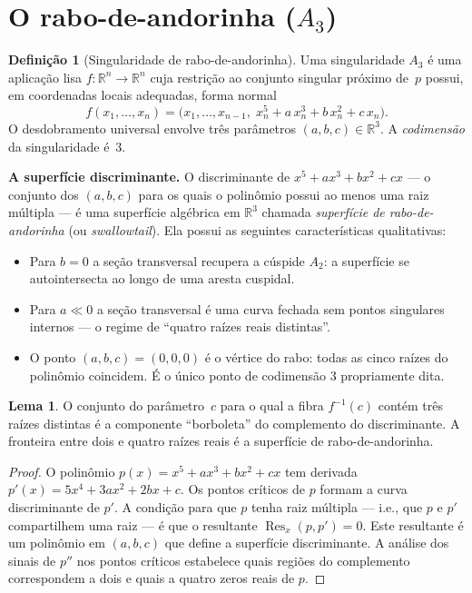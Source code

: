 \documentclass[12pt,a4paper,twoside]{book}
\theoremstyle{plain}
\theoremstyle{definition}
\newtheorem{lema}[teorema]{Lema}
\theoremstyle{definition}
\newtheorem{definicao}[teorema]{Definição}
\newcommand{\R}{\mathbb{R}}
\begin{document}
\section{O rabo-de-andorinha ($A_{3}$)}
\label{sec:rabo-de-andorinha}

\begin{definicao}[Singularidade de rabo-de-andorinha]\label{def:rabo}
Uma singularidade $A_{3}$ é uma aplicação lisa $f : \R^{n} \to \R^{n}$ cuja
restrição ao conjunto singular próximo de~$p$ possui, em coordenadas locais
adequadas, forma normal
\[
  f(x_{1},\dots,x_{n})
  = \bigl(x_{1},\dots,x_{n-1},\; x_{n}^{5}+a\,x_{n}^{3}+b\,x_{n}^{2}+c\,x_{n}\bigr).
\]
O desdobramento universal envolve três parâmetros $(a,b,c) \in \R^{3}$.
A \emph{codimensão} da singularidade é~$3$.
\end{definicao}

\textbf{A superfície discriminante.}
O discriminante de $x^{5}+ax^{3}+bx^{2}+cx$ --- o conjunto dos $(a,b,c)$ para
os quais o polinômio possui ao menos uma raiz múltipla --- é uma superfície
algébrica em $\R^{3}$ chamada \emph{superfície de rabo-de-andorinha} (ou
\emph{swallowtail}). Ela possui as seguintes características qualitativas:
\begin{itemize}
  \item Para $b = 0$ a seção transversal recupera a cúspide $A_{2}$: a
        superfície se autointersecta ao longo de uma aresta cuspidal.
  \item Para $a \ll 0$ a seção transversal é uma curva fechada sem pontos
        singulares internos --- o regime de ``quatro raízes reais distintas''.
  \item O ponto $(a,b,c) = (0,0,0)$ é o vértice do rabo: todas as cinco
        raízes do polinômio coincidem. É o único ponto de codimensão $3$
        propriamente dita.
\end{itemize}

\begin{lema}\label{lem:rabo-fronteira}
O conjunto do parâmetro~$c$ para o qual a fibra $f^{-1}(c)$ contém três
raízes distintas é a componente ``borboleta'' do complemento do discriminante.
A fronteira entre dois e quatro raízes reais é a superfície de rabo-de-andorinha.
\end{lema}

\begin{proof}
O polinômio $p(x) = x^{5}+ax^{3}+bx^{2}+cx$ tem derivada
$p'(x) = 5x^{4}+3ax^{2}+2bx+c$.
Os pontos críticos de $p$ formam a curva discriminante de $p'$.
A condição para que $p$ tenha raiz múltipla --- i.e., que $p$ e $p'$
compartilhem uma raiz --- é que o resultante $\operatorname{Res}_{x}(p,p')=0$.
Este resultante é um polinômio em $(a,b,c)$ que define a superfície discriminante.
A análise dos sinais de $p''$ nos pontos críticos estabelece quais regiões
do complemento correspondem a dois e quais a quatro zeros reais de $p$.
\end{proof}
\end{document}
